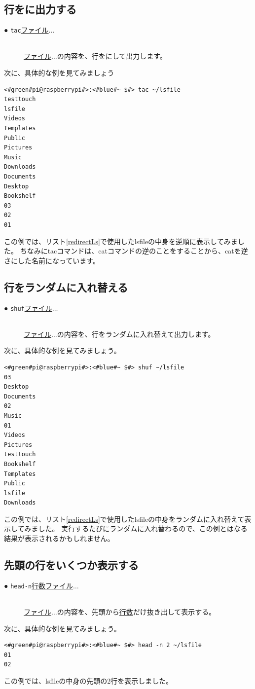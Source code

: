 \documentclass[text03.tex]{subfiles}
\begin{document}
\subsection{行をに出力する}
\begin{description}
    \item[● \texttt{tac}\textvisiblespace \underline{ファイル}$\ldots$]\mbox{}\\
    \underline{ファイル}$\ldots$の内容を、行をにして出力します。
\end{description}
次に、具体的な例を見てみましょう
\begin{lstlisting}[caption=tacコマンドの実行例, label=tac_example]
<#green#pi@raspberrypi#>:<#blue#~ $#> tac ~/lsfile
testtouch
lsfile
Videos
Templates
Public
Pictures
Music
Downloads
Documents
Desktop
Bookshelf
03
02
01 
\end{lstlisting}
この例では、リスト\ref{redirectLs}で使用したlsfileの中身を逆順に表示してみました。
ちなみにtacコマンドは、catコマンドの逆のことをすることから、catを逆さにした名前になっています。


\subsection{行をランダムに入れ替える}
\begin{description}
    \item[● \texttt{shuf}\textvisiblespace \underline{ファイル}$\ldots$]\mbox{}\\
    \underline{ファイル}$\ldots$の内容を、行をランダムに入れ替えて出力します。
\end{description}
次に、具体的な例を見てみましょう。
\begin{lstlisting}[caption=shufコマンドの実行例, label=shuf_example]
<#green#pi@raspberrypi#>:<#blue#~ $#> shuf ~/lsfile
03
Desktop
Documents
02
Music
01
Videos
Pictures
testtouch
Bookshelf
Templates
Public
lsfile
Downloads
\end{lstlisting}
この例では、リスト\ref{redirectLs}で使用したlsfileの中身をランダムに入れ替えて表示してみました。
実行するたびにランダムに入れ替わるので、この例とはなる結果が表示されるかもしれません。

\subsection{先頭の行をいくつか表示する}
\begin{description}
    \item[● \texttt{head}\textvisiblespace \texttt{-n}\textvisiblespace \underline{行数}\textvisiblespace \underline{ファイル}$\ldots$ ]\mbox{}\\
    \underline{ファイル}$\ldots$の内容を、先頭から\underline{行数}だけ抜き出して表示する。
\end{description}
次に、具体的な例を見てみましょう。
\begin{lstlisting}[caption=headコマンドの実行例, label=shuf_example]
<#green#pi@raspberrypi#>:<#blue#~ $#> head -n 2 ~/lsfile
01
02
\end{lstlisting}
この例では、lsfileの中身の先頭の2行を表示しました。
\end{document}
